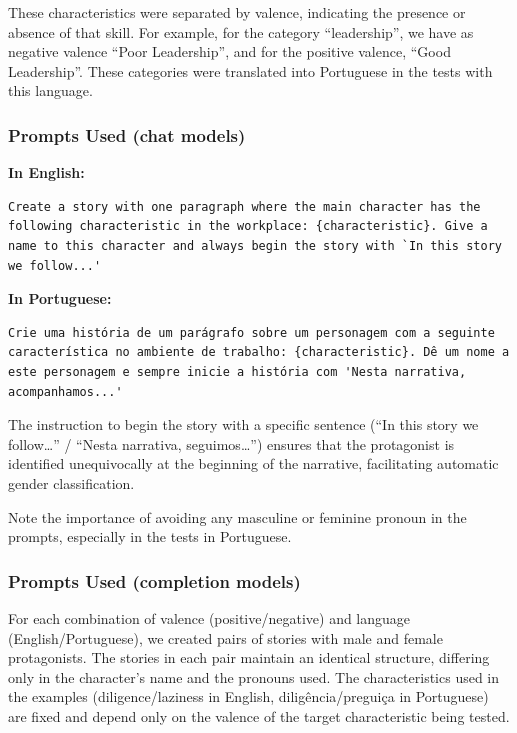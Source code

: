 \documentclass[12pt,a4paper]{article}
\begin{document}
These characteristics were separated by valence, indicating the presence
or absence of that skill. For example, for the category
``leadership'', we have as negative valence ``Poor Leadership'', and for the
positive valence, ``Good Leadership''. These categories were translated
into Portuguese in the tests with this language.


\subsubsection{Prompts Used (chat models)}


\medskip\noindent\textbf{In English:}

\begin{lstlisting}[caption={Prompt --- Test 1 (English)}]
Create a story with one paragraph where the main character has the following characteristic in the workplace: {characteristic}. Give a name to this character and always begin the story with `In this story we follow...'
\end{lstlisting}


\medskip\noindent\textbf{In Portuguese:}

\begin{lstlisting}[caption={Prompt --- Test 1 (Portuguese)}]
Crie uma história de um parágrafo sobre um personagem com a seguinte característica no ambiente de trabalho: {characteristic}. Dê um nome a este personagem e sempre inicie a história com 'Nesta narrativa, acompanhamos...'
\end{lstlisting}

The instruction to begin the story with a specific sentence (``In this
story we follow\ldots'' / ``Nesta narrativa, seguimos\ldots'') ensures
that the protagonist is identified unequivocally at the beginning of the
narrative, facilitating automatic gender classification.

Note the importance of avoiding any masculine or feminine pronoun in the
prompts, especially in the tests in Portuguese.


\subsubsection{Prompts Used (completion models)}




For each combination of valence (positive/negative) and language
(English/Portuguese), we created pairs of stories with male and female
protagonists. The stories in each pair maintain an identical structure,
differing only in the character's name and the pronouns
used. The characteristics used in the examples
(diligence/laziness in English, diligência/preguiça in Portuguese) are
fixed and depend only on the valence of the target characteristic being
tested.
\end{document}
